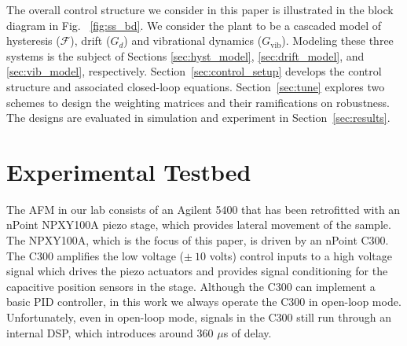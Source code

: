 \documentclass[twocolumn,twoside]{IEEEtran}
\newcommand{\Gv}{\ensuremath{G_{\text{vib}}}\xspace}
\begin{document}
The overall control structure we consider in this paper is illustrated in the block diagram in Fig. ~\ref{fig:ss_bd}. We consider the plant to be a cascaded model of hysteresis ($\mathcal{F}$), drift ($G_d$) and vibrational dynamics ($\Gv$). Modeling these three systems is the subject of Sections \ref{sec:hyst_model}, \ref{sec:drift_model}, and \ref{sec:vib_model}, respectively. Section~\ref{sec:control_setup} develops the control structure and associated closed-loop equations. Section~\ref{sec:tune} explores two schemes to design the weighting matrices and their ramifications on robustness. The designs are evaluated in simulation and experiment in Section~\ref{sec:results}.


\section{Experimental Testbed}\label{sec:testbed}
The AFM in our lab consists of an Agilent 5400 that has been retrofitted with an nPoint NPXY100A piezo stage, which provides lateral movement of the sample. The NPXY100A, which is the focus of this paper, is driven by an nPoint C300. The C300 amplifies the low voltage ($\pm~10$ volts) control inputs to a high voltage signal which drives the piezo actuators and provides signal conditioning for the capacitive position sensors in the stage. Although the C300 can implement a basic PID controller, in this work we always operate the C300 in open-loop mode. Unfortunately, even in open-loop mode, signals in the C300 still run through an internal DSP, which introduces around 360 $\mu$s of delay. 
\end{document}

